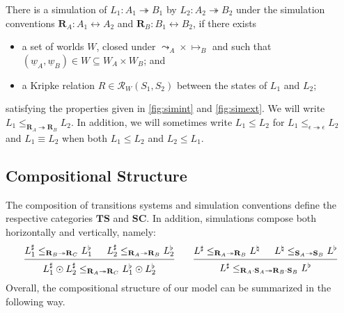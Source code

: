 \documentclass[acmsmall,screen,review,anonymous]{acmart}
\renewcommand{\preceq}{\le}
\newcommand{\intl}[1]{\underline{#1}}
\begin{document}
\begin{definition}
There is a simulation
of $L_1 : A_1 \twoheadrightarrow B_1$
by $L_2 : A_2 \twoheadrightarrow B_2$
under the simulation conventions
$\mathbf{R}_A : A_1 \leftrightarrow A_2$ and
$\mathbf{R}_B : B_1 \leftrightarrow B_2$,
if there exists
\begin{itemize}
\item a set of worlds $W$,
closed under ${\leadsto_A} \times {\mapsto_B}$ and
such that
$(\intl{w}_A, \intl{w}_B) \in W \subseteq W_A \times W_B$;
and
\item
a Kripke relation $R \in \mathcal{R}_W(S_1, S_2)$
between the states of $L_1$ and $L_2$;
\end{itemize}
satisfying the properties given in
\autoref{fig:simint} and
\autoref{fig:simext}.
We will write
$L_1 \preceq_{\mathbf{R}_A \twoheadrightarrow \mathbf{R}_B} L_2$.
In addition,
we will sometimes write $L_1 \le L_2$ for $L_1 \le_{\epsilon \twoheadrightarrow \epsilon} L_2$
and $L_1 \equiv L_2$ when both $L_1 \le L_2$ and $L_2 \le L_1$.
\end{definition}


\subsection{Compositional Structure} \label{sec:base:double} %

The composition of transitions systems and simulation conventions
define the respective categories $\mathbf{TS}$ and $\mathbf{SC}$.
In addition,
simulations compose both horizontally and vertically,
namely:
\[
  \begin{prooftree}
    \hypo{
      L_1^\sharp
      \preceq_{\mathbf{R}_B \twoheadrightarrow \mathbf{R}_C}
      L_1^\flat}
    \hypo{
      L_2^\sharp
      \preceq_{\mathbf{R}_A \twoheadrightarrow \mathbf{R}_B}
      L_2^\flat}
    \infer2{
      L_1^\sharp \odot L_2^\sharp
      \preceq_{\mathbf{R}_A \twoheadrightarrow \mathbf{R}_C}
      L_1^\flat \odot L_2^\flat}
  \end{prooftree}
  \qquad
  \begin{prooftree}
    \hypo{L^\sharp
      \preceq_{\mathbf{R}_A \twoheadrightarrow \mathbf{R}_B}
      L^\natural}
    \hypo{L^\natural
      \preceq_{\mathbf{S}_A \twoheadrightarrow \mathbf{S}_B}
      L^\flat}
    \infer2{L^\sharp
      \preceq_{\mathbf{R}_A \cdot \mathbf{S}_A \twoheadrightarrow
	   \mathbf{R}_B \cdot \mathbf{S}_B}
      L^\flat}
  \end{prooftree}
\]
Overall,
the compositional structure of our model
can be summarized in the following way.
\end{document}
